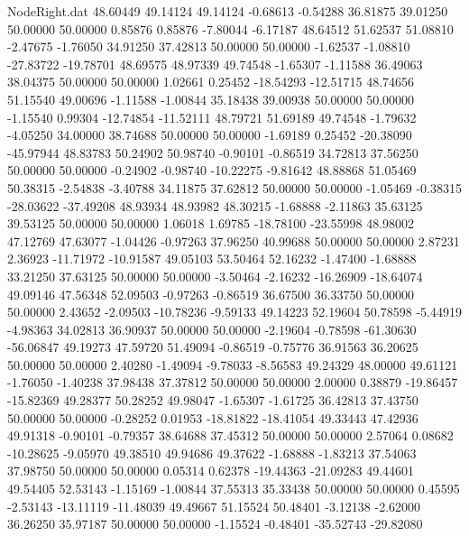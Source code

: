 \begin{filecontents}{NodeRight.dat}
  48.60449   49.14124   49.14124    -0.68613   -0.54288   36.81875   39.01250   50.00000   50.00000    0.85876    0.85876   -7.80044   -6.17187
  48.64512   51.62537   51.08810    -2.47675   -1.76050   34.91250   37.42813   50.00000   50.00000   -1.62537   -1.08810  -27.83722  -19.78701
  48.69575   48.97339   49.74548    -1.65307   -1.11588   36.49063   38.04375   50.00000   50.00000    1.02661    0.25452  -18.54293  -12.51715
  48.74656   51.15540   49.00696    -1.11588   -1.00844   35.18438   39.00938   50.00000   50.00000   -1.15540    0.99304  -12.74854  -11.52111
  48.79721   51.69189   49.74548    -1.79632   -4.05250   34.00000   38.74688   50.00000   50.00000   -1.69189    0.25452  -20.38090  -45.97944
  48.83783   50.24902   50.98740    -0.90101   -0.86519   34.72813   37.56250   50.00000   50.00000   -0.24902   -0.98740  -10.22275   -9.81642
  48.88868   51.05469   50.38315    -2.54838   -3.40788   34.11875   37.62812   50.00000   50.00000   -1.05469   -0.38315  -28.03622  -37.49208
  48.93934   48.93982   48.30215    -1.68888   -2.11863   35.63125   39.53125   50.00000   50.00000    1.06018    1.69785  -18.78100  -23.55998
  48.98002   47.12769   47.63077    -1.04426   -0.97263   37.96250   40.99688   50.00000   50.00000    2.87231    2.36923  -11.71972  -10.91587
  49.05103   53.50464   52.16232    -1.47400   -1.68888   33.21250   37.63125   50.00000   50.00000   -3.50464   -2.16232  -16.26909  -18.64074
  49.09146   47.56348   52.09503    -0.97263   -0.86519   36.67500   36.33750   50.00000   50.00000    2.43652   -2.09503  -10.78236   -9.59133
  49.14223   52.19604   50.78598    -5.44919   -4.98363   34.02813   36.90937   50.00000   50.00000   -2.19604   -0.78598  -61.30630  -56.06847
  49.19273   47.59720   51.49094    -0.86519   -0.75776   36.91563   36.20625   50.00000   50.00000    2.40280   -1.49094   -9.78033   -8.56583
  49.24329   48.00000   49.61121    -1.76050   -1.40238   37.98438   37.37812   50.00000   50.00000    2.00000    0.38879  -19.86457  -15.82369
  49.28377   50.28252   49.98047    -1.65307   -1.61725   36.42813   37.43750   50.00000   50.00000   -0.28252    0.01953  -18.81822  -18.41054
  49.33443   47.42936   49.91318    -0.90101   -0.79357   38.64688   37.45312   50.00000   50.00000    2.57064    0.08682  -10.28625   -9.05970
  49.38510   49.94686   49.37622    -1.68888   -1.83213   37.54063   37.98750   50.00000   50.00000    0.05314    0.62378  -19.44363  -21.09283
  49.44601   49.54405   52.53143    -1.15169   -1.00844   37.55313   35.33438   50.00000   50.00000    0.45595   -2.53143  -13.11119  -11.48039
  49.49667   51.15524   50.48401    -3.12138   -2.62000   36.26250   35.97187   50.00000   50.00000   -1.15524   -0.48401  -35.52743  -29.82080

\end{filecontents}
